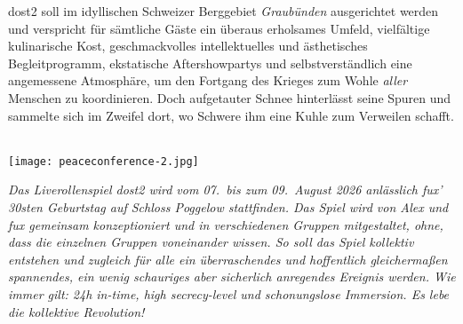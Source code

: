 \ac{dost2} soll im idyllischen Schweizer Berggebiet \emph{Graubünden} ausgerichtet
werden und verspricht für sämtliche Gäste ein überaus erholsames Umfeld,
vielfältige kulinarische Kost, geschmackvolles intellektuelles und
ästhetisches Begleitprogramm, ekstatische Aftershowpartys und
selbstverständlich eine angemessene Atmosphäre, um den Fortgang des Krieges zum
Wohle \emph{aller} Menschen zu koordinieren. Doch aufgetauter Schnee hinterlässt
seine Spuren und sammelte sich im Zweifel dort, wo Schwere ihm eine Kuhle zum
Verweilen schafft.\\\\
%
\begin{minipage}{\textwidth}
  \begin{center}
    \texttt{[image: peaceconference-2.jpg]}%
  \end{center}
  \emph{Das Liverollenspiel \ac{dost2} wird vom 07.~bis zum 09.~August 2026
  anlässlich fux' 30sten Geburtstag auf Schloss Poggelow stattfinden.
  Das Spiel wird von Alex und fux gemeinsam konzeptioniert und in verschiedenen
  Gruppen mitgestaltet, ohne, dass die einzelnen Gruppen voneinander wissen.
  So soll das Spiel kollektiv entstehen und zugleich für alle ein überraschendes
  und hoffentlich gleichermaßen spannendes, ein wenig schauriges aber sicherlich
  anregendes Ereignis werden.
  Wie immer gilt: 24h in-time, high secrecy-level und schonungslose Immersion.
  Es lebe die kollektive Revolution!}\\
\end{minipage}


